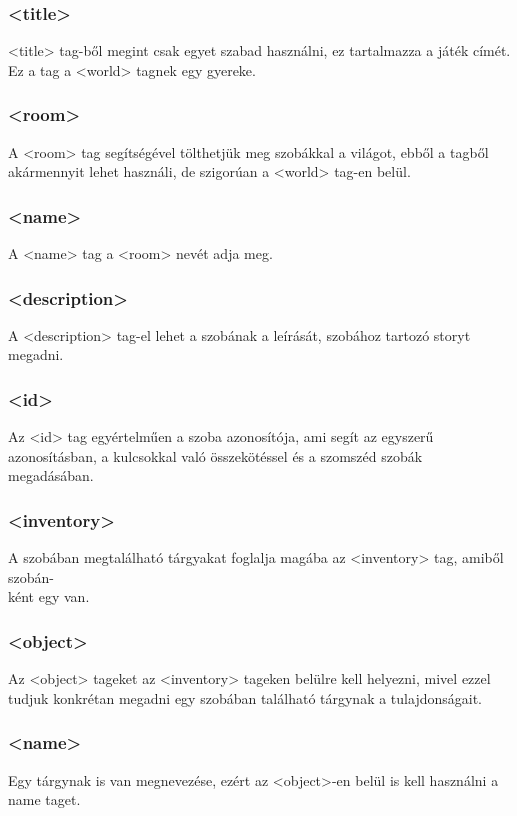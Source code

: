\documentclass{scrarticle}
\begin{document}
\subsubsection{<title>}
<title> tag-ből megint csak egyet szabad használni, ez tartalmazza a játék címét. Ez a tag a <world> tagnek egy gyereke.

\subsubsection{<room>}
A <room> tag segítségével tölthetjük meg szobákkal a világot, ebből a tagből akármennyit lehet használi, de szigorúan a <world> tag-en belül.

\subsubsection{<name>}
A <name> tag a <room> nevét adja meg.

\subsubsection{<description>}
A <description> tag-el lehet a szobának a leírását, szobához tartozó storyt megadni.

\subsubsection{<id>}
Az <id> tag egyértelműen a szoba azonosítója, ami segít az egyszerű azonosításban, a kulcsokkal való összekötéssel és a szomszéd szobák megadásában.

\subsubsection{<inventory>}
A szobában megtalálható tárgyakat foglalja magába az <inventory> tag, amiből szobán-\\ként egy van.

\subsubsection{<object>}
Az <object> tageket az <inventory> tageken belülre kell helyezni, mivel ezzel tudjuk konkrétan megadni egy szobában található tárgynak a tulajdonságait.

\subsubsection{<name>}
Egy tárgynak is van megnevezése, ezért az <object>-en belül is kell használni a name taget.
\end{document}
